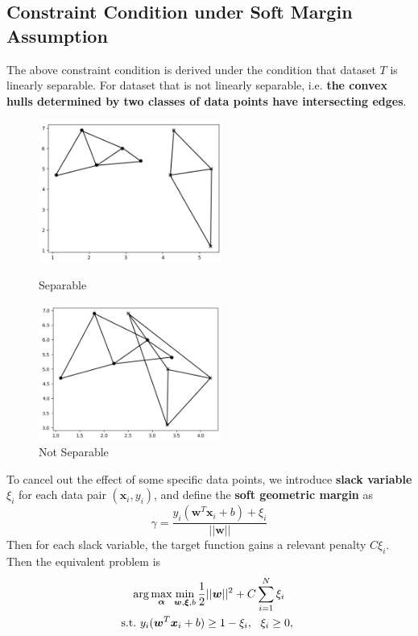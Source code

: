 \documentclass[12pt]{article}
\begin{document}
\subsection{Constraint Condition under Soft Margin Assumption}
The above constraint condition is derived under the condition that dataset $T$ is linearly separable. For dataset that is not linearly separable, i.e. \textbf{the convex hulls determined by two classes of data points have intersecting edges}.
\begin{figure}[H]
    \centering
    \begin{minipage}[t]{0.48\textwidth}
    \centering
    \includegraphics[width=6cm]{Note Files/ConvexHull1.png}
    \caption[name = figure]{Separable}
    \end{minipage}
    \begin{minipage}[t]{0.48\textwidth}
    \centering
    \includegraphics[width=6cm]{Note Files/ConvexHull.png}
    \caption{Not Separable}
    \end{minipage}
    \end{figure}
To cancel out the effect of some specific data points, we introduce \textbf{slack variable} $\xi_i$ for each data pair $(\bm{x}_i, y_i)$, and define the \textbf{soft geometric margin} as
\begin{equation}
    \gamma = \frac{y_i(\bm{w}^T \bm{x}_i + b) + \xi_i}{||\bm{w}||}
\end{equation}
Then for each slack variable, the target function gains a relevant penalty $C\xi_i$. Then the equivalent problem is
\begin{gather}
    \arg \max_{\bm{\alpha}} \min_{\bm{w},\bm{\xi},b} \frac{1}{2}||\bm{w}||^2 + C\sum_{i=1}^N \xi_i \notag \\ \text{s.t.}~y_i(\bm{w}^T \bm{x}_i + b) \geq 1 - \xi_i,~~\xi_i \geq 0,~
\end{gather}
\end{document}
